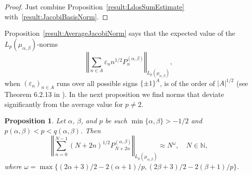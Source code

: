 \documentclass[11pt, leqno]{amsart}
\newtheorem{proposition}[theorem]{Proposition}
\theoremstyle{remark}
\numberwithin{equation}{section}
\newcommand{\NN}{\ensuremath{\mathbb{N}}}
\begin{document}
\begin{proof}
Just combine Proposition~\ref{result:LdosSumEstimate} with~\eqref{result:JacobiBasisNorm}.
\end{proof}


Proposition~\ref{result:AverageJacobiNorm} says that the expected value of the $L_p(\mu_{\alpha,\beta})$-norms \[
\left\Vert \sum_{n\in A} \varepsilon_n n^{1/2} P_n^{(\alpha,\beta)}\right\Vert_{L_p(\mu_{\alpha,\beta})},
\]
when $(\varepsilon_n)_{n\in A}$ runs over all possible signs $\{\pm 1\}^A$,
is of the order of $|A|^{1/2}$ (see Theorem 6.2.13 in  \cite{AlbiacKalton2006}). In the next proposition we find norms that deviate significantly from the average value for $p\not= 2$.


\begin{proposition}
\label{result:CCJacobiNorm} 
Let $\alpha$, $\beta$, and $p$ be such $\min\{\alpha, \beta\} >-1/2$ and 
$p(\alpha,\beta)<p<q(\alpha,\beta)$.
Then
\[
\left\Vert\sum_{n=0}^{N-1} (N+2n)^{1/2} P_{N+2n}^{(\alpha,\beta)} 
\right\Vert_{L_p(\mu_{\alpha,\beta})} \approx N^\omega, \quad N\in\NN,
\]
where $\omega=\max\{{(2\alpha+3)/2-2(\alpha+1)/p},{(2\beta+3)/2-2(\beta+1)/p}\}$.
\end{proposition}
\end{document}
